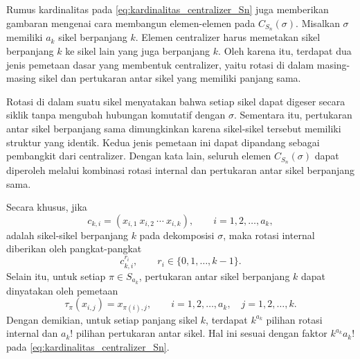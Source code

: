 Rumus kardinalitas pada \eqref{eq:kardinalitas_centralizer_Sn} juga memberikan gambaran mengenai cara membangun elemen-elemen pada $C_{S_n}(\sigma)$. Misalkan $\sigma$ memiliki $a_k$ sikel berpanjang $k$. Elemen centralizer harus memetakan sikel berpanjang $k$ ke sikel lain yang juga berpanjang $k$. Oleh karena itu, terdapat dua jenis pemetaan dasar yang membentuk centralizer, yaitu rotasi di dalam masing-masing sikel dan pertukaran antar sikel yang memiliki panjang sama.

Rotasi di dalam suatu sikel menyatakan bahwa setiap sikel dapat digeser secara siklik tanpa mengubah hubungan komutatif dengan $\sigma$. Sementara itu, pertukaran antar sikel berpanjang sama dimungkinkan karena sikel-sikel tersebut memiliki struktur yang identik. Kedua jenis pemetaan ini dapat dipandang sebagai pembangkit dari centralizer. Dengan kata lain, seluruh elemen $C_{S_n}(\sigma)$ dapat diperoleh melalui kombinasi rotasi internal dan pertukaran antar sikel berpanjang sama.

Secara khusus, jika
\[
  c_{k,i}=(x_{i,1}\ x_{i,2}\ \cdots\ x_{i,k}),
  \qquad i=1,2,\ldots,a_k,
\]
adalah sikel-sikel berpanjang $k$ pada dekomposisi $\sigma$, maka rotasi internal diberikan oleh pangkat-pangkat
\[
  c_{k,i}^{r_i},
  \qquad r_i\in\{0,1,\ldots,k-1\}.
\]
Selain itu, untuk setiap $\pi\in S_{a_k}$, pertukaran antar sikel berpanjang $k$ dapat dinyatakan oleh pemetaan
\[
  \tau_\pi(x_{i,j})=x_{\pi(i),j},
  \qquad i=1,2,\ldots,a_k,\quad j=1,2,\ldots,k.
\]
Dengan demikian, untuk setiap panjang sikel $k$, terdapat $k^{a_k}$ pilihan rotasi internal dan $a_k!$ pilihan pertukaran antar sikel. Hal ini sesuai dengan faktor $k^{a_k}a_k!$ pada \eqref{eq:kardinalitas_centralizer_Sn}.

